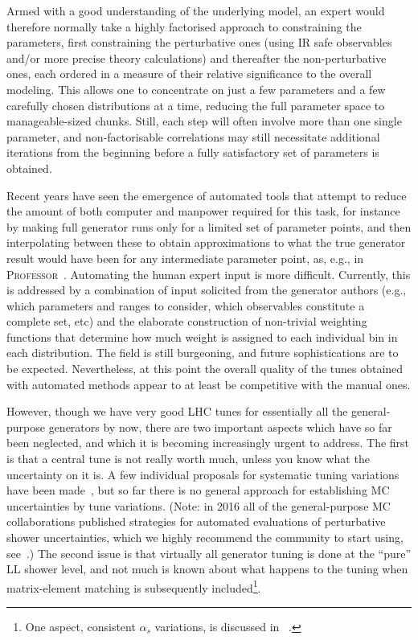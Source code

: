 Armed with a good understanding of the underlying model, an expert would
therefore normally take a highly factorised approach to constraining
the parameters, 
first constraining the perturbative ones (using IR safe observables
and/or more precise theory calculations) and thereafter the
non-perturbative ones, each ordered in a measure of their relative
significance to the overall modeling. This  allows one 
to concentrate on just a few parameters and a few carefully chosen 
distributions at a time, reducing the full parameter space to manageable-sized
chunks. Still, each step will often involve more than one single
parameter, and non-factorisable 
correlations may still necessitate additional iterations from
the beginning before a fully satisfactory set of parameters is obtained. 

Recent years have seen the emergence
of automated tools that attempt to reduce the amount of both computer
and manpower required for this task, for instance 
by making full generator runs only for a
limited set of parameter points, and then interpolating between
these  to obtain approximations to what the true generator result
would have been for any intermediate parameter point, as, e.g., in 
\textsc{Professor}~\cite{Buckley:2009bj}. 
Automating the human expert input is more difficult. 
Currently, this is addressed by a combination of input solicited from
the generator authors (e.g., which parameters and ranges to consider,
which observables constitute a complete set, etc)
and the elaborate construction of non-trivial weighting
functions that determine how much weight is assigned to each 
individual bin in each distribution. The field is still
burgeoning, and future sophistications are to be
expected. 
Nevertheless, at this point the overall quality of the tunes
obtained with automated methods appear to at least be competitive with
the manual ones. 

%
However, though we have very good LHC tunes for essentially all the
general-purpose generators by now, there are two important aspects
which have so far been neglected, and which it is becoming
increasingly urgent to address. The first is that a central tune is
not really worth much, unless you know what the uncertainty on it is. 
A few individual proposals for systematic tuning variations have
been made~\cite{Skands:2010ak,Richardson:2012bn}, but so far there is
no general approach for 
establishing MC uncertainties by tune variations. 
(Note: in 2016 all of the general-purpose MC collaborations
published strategies for automated evaluations of
perturbative shower uncertainties, which we highly recommend the
community to start using, see~\cite{Badger:2016bpw,Mrenna:2016sih,Bellm:2016voq}.)
The second issue is
that virtually all generator tuning is done at the ``pure'' LL shower
level,  and not much is known about what happens
to the tuning when matrix-element matching is subsequently
included\footnote{One aspect, consistent $\alpha_s$ variations, is
  discussed in ~\cite{Cooper:2011gk}.}.

